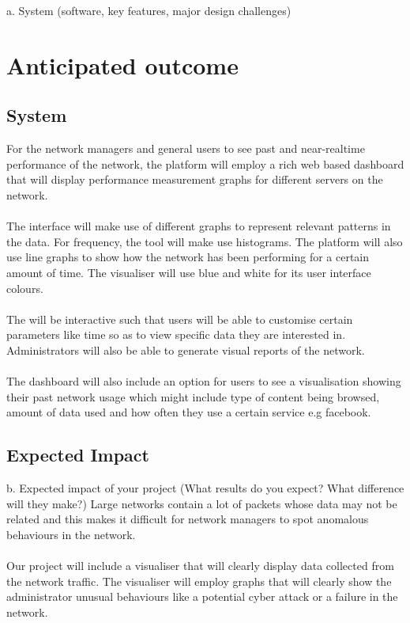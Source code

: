 a. System (software, key features, major design challenges) 

\section{Anticipated outcome}
\subsection{System}
For the network managers and general users to see past and near-realtime performance of the network, the platform will employ a rich web based dashboard that will display performance measurement graphs for different servers on the network.
\paragraph{}
The interface will make use of different graphs to represent relevant patterns in the data. For frequency, the tool will make use histograms. The platform will also use line graphs to show how the network has been performing for a certain amount of time. The visualiser will use blue and white for its user interface colours.
\paragraph{}
The will be interactive such that users will be able to customise certain parameters like time so as to view specific data they are interested in. Administrators will also be able to generate visual reports of the network.
\paragraph{}
The dashboard will also include an option for users to see a visualisation showing their past network usage which might include type of content being browsed, amount of data used and how often they use a certain service e.g facebook.

\subsection{Expected Impact}
b. Expected impact of your project (What results do you expect? What difference will they make?)
Large networks contain a lot of packets whose data may not be related and this makes it difficult for network managers to spot anomalous behaviours in the network.
\paragraph{}
Our project will include a visualiser that will clearly display data collected from the network traffic. The visualiser will employ graphs that will clearly show the administrator unusual behaviours like a potential cyber attack or a failure in the network.
